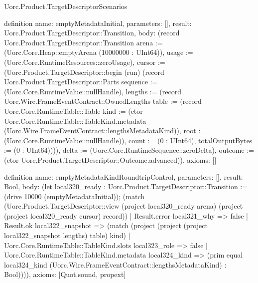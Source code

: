 \begin{lexlean}{Uorc.Product.TargetDescriptorScenarios}
\begin{semanticmodule}
definition{
  name: emptyMetadataInitial,
  parameters: [],
  result: Uorc.Product.TargetDescriptor::Transition,
  body: (record Uorc.Product.TargetDescriptor::Transition {arena := (Uorc.Core.Heap::emptyArena (10000000 : UInt64)), usage := (Uorc.Core.RuntimeResources::zeroUsage), cursor := (Uorc.Product.TargetDescriptor::begin (run) (record Uorc.Product.TargetDescriptor::Parts {sequence := (Uorc.Core.RuntimeValue::nullHandle), lengths := (record Uorc.Wire.FrameEventContract::OwnedLengths {table := (record Uorc.Core.RuntimeTable::Table {kind := (ctor Uorc.Core.RuntimeTable::TableKind.metadata (Uorc.Wire.FrameEventContract::lengthsMetadataKind)), root := (Uorc.Core.RuntimeValue::nullHandle)}), count := (0 : UInt64), totalOutputBytes := (0 : UInt64)})})), delta := (Uorc.Core.RuntimeSequence::zeroDelta), outcome := (ctor Uorc.Product.TargetDescriptor::Outcome.advanced)}),
  axioms: []
}

definition{
  name: emptyMetadataKindRoundtripControl,
  parameters: [],
  result: Bool,
  body: (let local320_ready : Uorc.Product.TargetDescriptor::Transition := (drive 10000 (emptyMetadataInitial)); (match (Uorc.Product.TargetDescriptor::view (project local320_ready arena) (project (project local320_ready cursor) record))
    | Result.error local321_why => false
    | Result.ok local322_snapshot => (match (project (project (project local322_snapshot lengths) table) kind)
      | Uorc.Core.RuntimeTable::TableKind.slots local323_role => false
      | Uorc.Core.RuntimeTable::TableKind.metadata local324_kind => (prim equal local324_kind (Uorc.Wire.FrameEventContract::lengthsMetadataKind) : Bool)))),
  axioms: [Quot.sound, propext]
}


\end{semanticmodule}
\end{lexlean}
